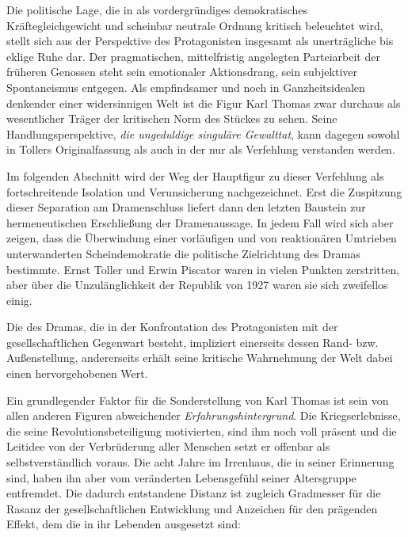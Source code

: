 Die politische Lage, die in  als vordergründiges
demokratisches Kräftegleichgewicht und scheinbar neutrale Ordnung kritisch
beleuchtet wird, stellt sich aus der Perspektive des Protagonisten insgesamt
als unerträgliche bis eklige 
Ruhe dar. Der pragmatischen, mittelfristig
angelegten Parteiarbeit der früheren Genossen steht sein emotionaler
Aktionsdrang, sein subjektiver Spontaneismus entgegen. Als empfindsamer und
noch in Ganzheitsidealen denkender  einer widersinnigen
Welt ist die Figur Karl Thomas zwar durchaus als wesentlicher Träger der
kritischen Norm des Stückes zu sehen. Seine Handlungsperspektive, \emph{die
ungeduldige singuläre Gewalttat}, kann dagegen sowohl in Tollers
Originalfassung als auch in der  nur als Verfehlung
verstanden werden.

Im folgenden Abschnitt wird der Weg der Hauptfigur
zu dieser Verfehlung als fortschreitende Isolation und Verunsicherung
nachgezeichnet. Erst die Zuspitzung dieser Separation am Dramenschluss
liefert dann den letzten Baustein zur hermeneutischen
Erschließung der Dramenaussage. In jedem
Fall wird sich aber zeigen, dass die Überwindung einer vorläufigen und von
reaktionären Umtrieben unterwanderten Scheindemokratie die politische
Zielrichtung des Dramas bestimmte. Ernst Toller und Erwin Piscator waren in
vielen Punkten zerstritten, aber über die Unzulänglichkeit der Republik von
1927 waren sie sich zweifellos einig.


Die \Cite{Grundidee} des Dramas, die in der Konfrontation des Protagonisten
mit der gesellschaftlichen Gegenwart besteht, impliziert einerseits dessen
Rand- bzw. Außenstellung, andererseits erhält seine kritische Wahrnehmung der
Welt dabei einen hervorgehobenen Wert. 

Ein grundlegender Faktor für die Sonderstellung von Karl Thomas ist sein von
allen anderen Figuren abweichender \emph{Erfahrungshintergrund}. Die
Kriegserlebnisse, die seine Revolutionsbeteiligung motivierten, sind ihm noch
voll präsent und die Leitidee von der Verbrüderung aller Menschen setzt er
offenbar als selbstverständlich voraus.  
Die acht Jahre im Irrenhaus, die in seiner Erinnerung \Cite{wie ausgelöscht}
 sind, haben ihn aber vom veränderten Lebensgefühl seiner
Altersgruppe entfremdet. Die dadurch entstandene Distanz ist zugleich
Gradmesser für die Rasanz der gesellschaftlichen Entwicklung und
Anzeichen für den prägenden Effekt, dem die in ihr  Lebenden
ausgesetzt sind:

